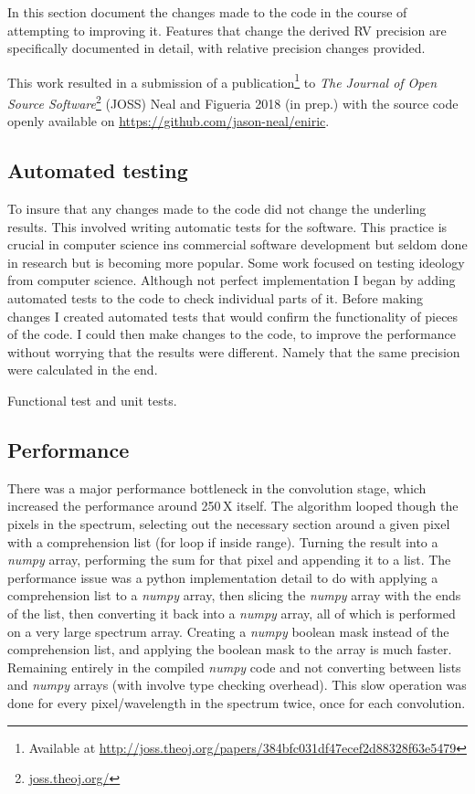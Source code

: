 {In this section  document the changes made to the code in the course of attempting to improving it.
Features that change the derived {RV} precision are specifically documented in detail, with relative precision changes provided.

This work resulted in a submission of a publication\footnote{Available at \href{http://joss.theoj.org/papers/384bfc031df47ecef2d88328f63e5479}{http://joss.theoj.org/papers/384bfc031df47ecef2d88328f63e5479}} to \emph{The Journal of Open Source Software}\footnote{\href{http://joss.theoj.org/}{joss.theoj.org/}} (JOSS) {Neal and Figueria 2018 (in prep.)} with the source code openly available on \href{Github}{https://github.com/jason-neal/eniric}.


\subsection{Automated testing}
To insure that any changes made to the code did not change the underling results.
This involved writing automatic tests for the software.
This practice is crucial in computer science ins commercial software development but seldom done in research but is becoming more popular.
Some work focused on testing ideology from computer science.
Although not perfect implementation I began by adding automated tests to the code to check individual parts of it.
Before making changes I created automated tests that would confirm the functionality of pieces of the code.
I could then make changes to the code, to improve the performance without worrying that the results were different.
Namely that the same precision were calculated in the end.

Functional test and unit tests.


\subsection{Performance}
\label{subsec:code_performance}
There was a major performance bottleneck in the convolution stage, which increased the performance around 250\,X itself.
The algorithm looped though the pixels in the spectrum, selecting out the necessary section around a given pixel with a comprehension list (for loop if inside range).
Turning the result into a \emph{numpy} array, performing the sum for that pixel and appending it to a list.
The performance issue was a python implementation detail to do with applying a comprehension list to a \emph{numpy} array, then slicing the \emph{numpy} array with the ends of the list, then converting it back into a \emph{numpy} array, all of which is performed on a very large spectrum array.
Creating a \emph{numpy} boolean mask instead of the comprehension list, and applying the boolean mask to the array is much faster.
Remaining entirely in the compiled \emph{numpy} code and not converting between lists and \emph{numpy} arrays (with involve type checking overhead).
This slow operation was done for every pixel/wavelength in the spectrum twice, once for each convolution.

}
